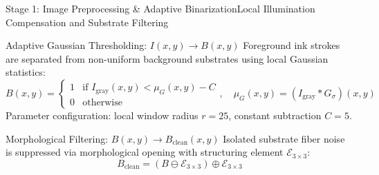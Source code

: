 \documentclass[aspectratio=169]{beamer}
\begin{document}
\begin{frame}{Stage 1: Image Preprocessing \& Adaptive Binarization}{Local Illumination Compensation and Substrate Filtering}
\begin{block}{Adaptive Gaussian Thresholding: $I(x,y) \rightarrow B(x,y)$}
Foreground ink strokes are separated from non-uniform background substrates using local Gaussian statistics:
\[
  B(x,y) = \begin{cases} 
    1 & \text{if } I_{\text{gray}}(x,y) < \mu_G(x,y) - C \\
    0 & \text{otherwise}
  \end{cases}, \quad \mu_G(x,y) = (I_{\text{gray}} * G_\sigma)(x,y)
\]
Parameter configuration: local window radius $r=25$, constant subtraction $C=5$.
\end{block}
\begin{block}{Morphological Filtering: $B(x,y) \rightarrow B_{\text{clean}}(x,y)$}
Isolated substrate fiber noise is suppressed via morphological opening with structuring element $\mathcal{E}_{3\times 3}$:
\[
  B_{\text{clean}} = (B \ominus \mathcal{E}_{3\times 3}) \oplus \mathcal{E}_{3\times 3}
\]
\end{block}
\end{frame}
\end{document}
